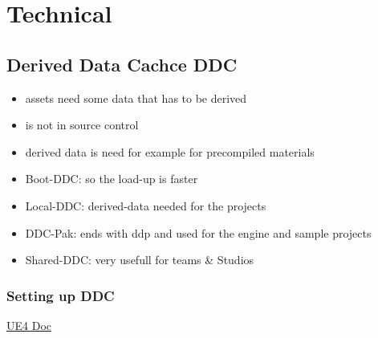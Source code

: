 \chapter{Technical}
    \section{Derived Data Cachce DDC}
        \begin{itemize}
            \item assets need some data that has to be derived
            \item is not in source control
            \item derived data is need for example for precompiled materials
            \item Boot-DDC: so the load-up is faster
            \item Local-DDC: derived-data needed for the projects
            \item DDC-Pak: ends with ddp and used for the engine and sample projects
            \item Shared-DDC: very usefull for teams \& Studios
        \end{itemize}

        \subsection{Setting up DDC}
            \href{https://docs.unrealengine.com/4.27/en-US/ProductionPipelines/DerivedDataCache/#settingupsharedddc}{UE4 Doc}

            